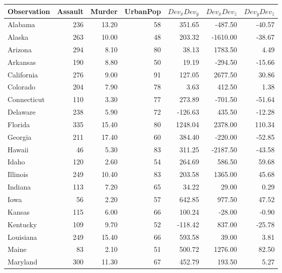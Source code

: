 \documentclass[nohyper,justified]{tufte-handout}\usepackage[]{graphicx}\usepackage[]{color}
\newcommand{\dev}[1] {Dev_{\bar{#1}}}
\begin{document}
\begin{table}[ht]
\centering
\begin{tabular}{lrrrrrr}
  \toprule
Observation & Assault & Murder & UrbanPop & $\dev{x}\dev{y}$ & $\dev{x}\dev{z}$ & $\dev{y}\dev{z}$ \\ 
  \midrule
Alabama & 236 & 13.20 &  58 & 351.65 & -487.50 & -40.57 \\ 
   \rowcolor[gray]{0.95}Alaska & 263 & 10.00 &  48 & 203.32 & -1610.00 & -38.67 \\ 
  Arizona & 294 & 8.10 &  80 & 38.13 & 1783.50 & 4.49 \\ 
   \rowcolor[gray]{0.95}Arkansas & 190 & 8.80 &  50 & 19.19 & -294.50 & -15.66 \\ 
  California & 276 & 9.00 &  91 & 127.05 & 2677.50 & 30.86 \\ 
   \rowcolor[gray]{0.95}Colorado & 204 & 7.90 &  78 & 3.63 & 412.50 & 1.38 \\ 
  Connecticut & 110 & 3.30 &  77 & 273.89 & -701.50 & -51.64 \\ 
   \rowcolor[gray]{0.95}Delaware & 238 & 5.90 &  72 & -126.63 & 435.50 & -12.28 \\ 
  Florida & 335 & 15.40 &  80 & 1248.04 & 2378.00 & 110.34 \\ 
   \rowcolor[gray]{0.95}Georgia & 211 & 17.40 &  60 & 384.40 & -220.00 & -52.85 \\ 
  Hawaii &  46 & 5.30 &  83 & 311.25 & -2187.50 & -43.58 \\ 
   \rowcolor[gray]{0.95}Idaho & 120 & 2.60 &  54 & 264.69 & 586.50 & 59.68 \\ 
  Illinois & 249 & 10.40 &  83 & 203.58 & 1365.00 & 45.68 \\ 
   \rowcolor[gray]{0.95}Indiana & 113 & 7.20 &  65 & 34.22 & 29.00 & 0.29 \\ 
  Iowa &  56 & 2.20 &  57 & 642.85 & 977.50 & 47.52 \\ 
   \rowcolor[gray]{0.95}Kansas & 115 & 6.00 &  66 & 100.24 & -28.00 & -0.90 \\ 
  Kentucky & 109 & 9.70 &  52 & -118.42 & 837.00 & -25.78 \\ 
   \rowcolor[gray]{0.95}Louisiana & 249 & 15.40 &  66 & 593.58 & 39.00 & 3.81 \\ 
  Maine &  83 & 2.10 &  51 & 500.72 & 1276.00 & 82.50 \\ 
   \rowcolor[gray]{0.95}Maryland & 300 & 11.30 &  67 & 452.79 & 193.50 & 5.27 \\ 

\end{tabular}
\end{table}
\end{document}
